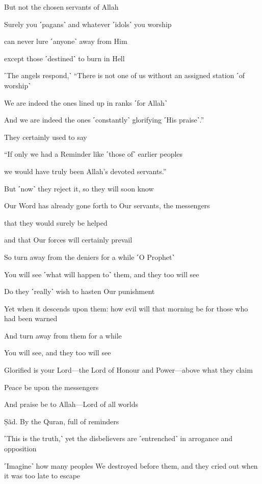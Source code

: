 But not the chosen servants of Allah

Surely you ˹pagans˺ and whatever ˹idols˺ you worship

can never lure ˹anyone˺ away from Him

except those ˹destined˺ to burn in Hell

˹The angels respond,˺ “There is not one of us without an assigned station ˹of worship˺

We are indeed the ones lined up in ranks ˹for Allah˺

And we are indeed the ones ˹constantly˺ glorifying ˹His praise˺.”

They certainly used to say

“If only we had a Reminder like ˹those of˺ earlier peoples

we would have truly been Allah’s devoted servants.”

But ˹now˺ they reject it, so they will soon know

Our Word has already gone forth to Our servants, the messengers

that they would surely be helped

and that Our forces will certainly prevail

So turn away from the deniers for a while ˹O Prophet˺

You will see ˹what will happen to˺ them, and they too will see

Do they ˹really˺ wish to hasten Our punishment

Yet when it descends upon them: how evil will that morning be for those who had been warned

And turn away from them for a while

You will see, and they too will see

Glorified is your Lord—the Lord of Honour and Power—above what they claim

Peace be upon the messengers

And praise be to Allah—Lord of all worlds

Ṣãd. By the Quran, full of reminders

˹This is the truth,˺ yet the disbelievers are ˹entrenched˺ in arrogance and opposition

˹Imagine˺ how many peoples We destroyed before them, and they cried out when it was too late to escape


